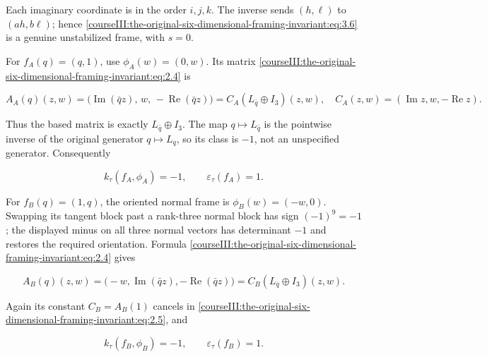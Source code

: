 Each imaginary coordinate is in the order \(i,j,k\). The inverse sends \((h,\ell)\) to \((ah,b\ell)\); hence \eqref{courseIII:the-original-six-dimensional-framing-invariant:eq:3.6} is a genuine unstabilized frame, with \(s=0\).

For \(f_A(q)=(q,1)\), use \(\phi_A(w)=(0,w)\). Its matrix \eqref{courseIII:the-original-six-dimensional-framing-invariant:eq:2.4} is

\begin{equation}
A_A(q)(z,w)=
    \bigl(\operatorname{Im}(\bar qz),\,w,\,
         -\operatorname{Re}(\bar qz)\bigr)
 = C_A(L_{\bar q}\oplus I_3)(z,w),
\quad
 C_A(z,w)=(\operatorname{Im}z,w,-\operatorname{Re}z).
 \label{courseIII:the-original-six-dimensional-framing-invariant:eq:3.7}
\end{equation}

Thus the based matrix is exactly \(L_{\bar q}\oplus I_3\).
The map \(q\mapsto L_{\bar q}\) is the pointwise inverse of the original generator \(q\mapsto L_q\), so its class is \(-1\), not an unspecified generator. Consequently

\begin{equation}
k_\tau(f_A,\phi_A)=-1,\qquad\varepsilon_\tau(f_A)=1.
 \label{courseIII:the-original-six-dimensional-framing-invariant:eq:3.8}
\end{equation}

For \(f_B(q)=(1,q)\), the oriented normal frame is
\(\phi_B(w)=(-w,0)\). Swapping its tangent block past a rank-three normal block has sign \((-1)^9=-1\); the displayed minus on all three normal vectors has determinant \(-1\) and restores the required orientation. Formula \eqref{courseIII:the-original-six-dimensional-framing-invariant:eq:2.4} gives

\begin{equation}
A_B(q)(z,w)=
  \bigl(-w,\operatorname{Im}(\bar qz),
              -\operatorname{Re}(\bar qz)\bigr)
 =C_B(L_{\bar q}\oplus I_3)(z,w).
 \label{courseIII:the-original-six-dimensional-framing-invariant:eq:3.9}
\end{equation}

Again its constant \(C_B=A_B(1)\) cancels in \eqref{courseIII:the-original-six-dimensional-framing-invariant:eq:2.5}, and

\begin{equation}
k_\tau(f_B,\phi_B)=-1,\qquad\varepsilon_\tau(f_B)=1.
 \label{courseIII:the-original-six-dimensional-framing-invariant:eq:3.10}
\end{equation}

